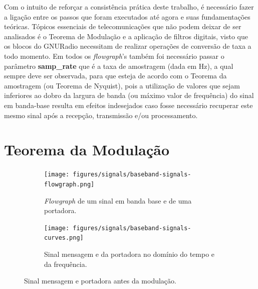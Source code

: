 \documentclass[
  12pt,				%
  openright,			%
  twoside,			%
  a4paper,			%
  english,			%
  french,				%
  spanish,			%
  brazil,				%
  ]{abntex2}
\begin{document}
Com o intuito de reforçar a consistência prática deste trabalho, é necessário fazer a ligação entre os passos que foram executados até agora e suas fundamentações teóricas. Tópicos essenciais
de telecomunicações que não podem deixar de ser analisados é o Teorema de Modulação e a aplicação de filtros digitais, visto que os blocos do GNURadio necessitam de realizar operações de
conversão de taxa a todo momento.
Em todos os \textit{flowgraph}'s também foi necessário passar o parâmetro \textbf{samp\_rate} que é a taxa de amostragem (dada em Hz), a qual sempre deve ser observada, para que esteja de acordo com o
Teorema da amostragem (ou Teorema de Nyquist), pois a utilização de valores que sejam inferiores ao dobro da largura de banda (ou máximo valor de frequência) do sinal em banda-base resulta em
efeitos indesejados caso fosse necessário recuperar este mesmo sinal após a recepção, transmissão e/ou processamento.

\section*{Teorema da Modulação}

\begin{figure}[!htb]
  \centering
  \begin{subfigure}[b]{0.8\linewidth}
    \centering
    \caption{\textit{Flowgraph} de um sinal em banda base e de uma portadora.}
    \texttt{[image: figures/signals/baseband-signals-flowgraph.png]}
    \label{fig:baseband_flowgraph}
  \end{subfigure}

  \begin{subfigure}[b]{0.8\linewidth}
    \centering
    \caption{Sinal mensagem e da portadora no domínio do tempo e da frequência.}
    \texttt{[image: figures/signals/baseband-signals-curves.png]}
    \label{fig:baseband_curves}
  \end{subfigure}
  \caption{Sinal mensagem e portadora antes da modulação.}
  \label{fig:baseband_signals}
\end{figure}
\end{document}
